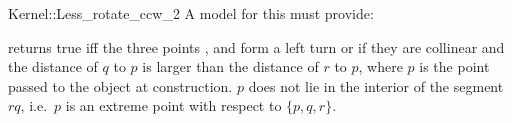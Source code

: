 \begin{ccRefFunctionObjectConcept}{Kernel::Less_rotate_ccw_2}
A model for this must provide:


{}
 
{returns true iff the three points ,  
and  form a left turn or if they are collinear and
the distance of $q$ to $p$ is
larger than the distance of $r$ to $p$, where $p$ is the point
passed to the object at construction.
\ccPrecond $p$ does not lie in the interior of the segment $rq$,
i.e.~$p$ is an extreme point with respect to $\{p,q,r\}$.}

\end{ccRefFunctionObjectConcept}
